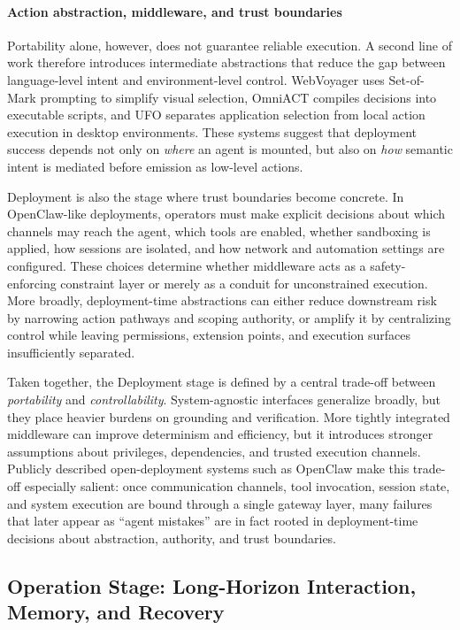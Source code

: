 \paragraph{Action abstraction, middleware, and trust boundaries}
Portability alone, however, does not guarantee reliable execution. A second line of work therefore introduces intermediate abstractions that reduce the gap between language-level intent and environment-level control. WebVoyager \cite{he2024webvoyager} uses Set-of-Mark prompting to simplify visual selection, OmniACT \cite{kapoor2024omniact} compiles decisions into executable scripts, and UFO \cite{zhang2025ufo} separates application selection from local action execution in desktop environments. These systems suggest that deployment success depends not only on \emph{where} an agent is mounted, but also on \emph{how} semantic intent is mediated before emission as low-level actions.

Deployment is also the stage where trust boundaries become concrete. In OpenClaw-like deployments, operators must make explicit decisions about which channels may reach the agent, which tools are enabled, whether sandboxing is applied, how sessions are isolated, and how network and automation settings are configured. These choices determine whether middleware acts as a safety-enforcing constraint layer or merely as a conduit for unconstrained execution. More broadly, deployment-time abstractions can either reduce downstream risk by narrowing action pathways and scoping authority, or amplify it by centralizing control while leaving permissions, extension points, and execution surfaces insufficiently separated.

Taken together, the Deployment stage is defined by a central trade-off between \emph{portability} and \emph{controllability}. System-agnostic interfaces generalize broadly, but they place heavier burdens on grounding and verification. More tightly integrated middleware can improve determinism and efficiency, but it introduces stronger assumptions about privileges, dependencies, and trusted execution channels. Publicly described open-deployment systems such as OpenClaw make this trade-off especially salient: once communication channels, tool invocation, session state, and system execution are bound through a single gateway layer, many failures that later appear as ``agent mistakes'' are in fact rooted in deployment-time decisions about abstraction, authority, and trust boundaries.
\subsection{Operation Stage: Long-Horizon Interaction, Memory, and Recovery}
\label{sec:operation}

